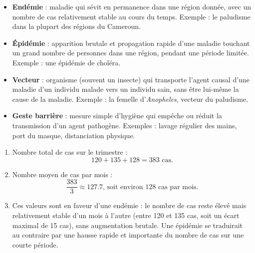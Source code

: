 \documentclass[11pt]{article}
\newcommand{\cle}[1]{{\popxbold\color{popdark}#1}}
\begin{document}
\begin{corrige}
\begin{itemize}
\item \textbf{Endémie} : maladie qui sévit en permanence dans une région donnée, avec un nombre de cas relativement stable au cours du temps. Exemple : le paludisme dans la plupart des régions du Cameroun.
\item \textbf{Épidémie} : apparition brutale et propagation rapide d'une maladie touchant un grand nombre de personnes dans une région, pendant une période limitée. Exemple : une épidémie de choléra.
\item \textbf{Vecteur} : organisme (souvent un insecte) qui transporte l'agent causal d'une maladie d'un individu malade vers un individu sain, sans être lui-même la cause de la maladie. Exemple : la femelle d'\emph{Anopheles}, vecteur du paludisme.
\item \textbf{Geste barrière} : mesure simple d'hygiène qui empêche ou réduit la transmission d'un agent pathogène. Exemples : lavage régulier des mains, port du masque, distanciation physique.
\end{itemize}
\end{corrige}

\begin{corrige}
\begin{enumerate}
\item Nombre total de cas sur le trimestre :
\[120 + 135 + 128 = 383 \text{ cas.}\]
\item Nombre moyen de cas par mois :
\[\frac{383}{3} \approx \num{127,7} \text{, soit environ } \num{128} \text{ cas par mois.}\]
\item Ces valeurs sont en faveur d'une \cle{endémie} : le nombre de cas reste élevé mais relativement stable d'un mois à l'autre (entre 120 et 135 cas, soit un écart maximal de 15 cas), sans augmentation brutale. Une épidémie se traduirait au contraire par une hausse rapide et importante du nombre de cas sur une courte période.
\end{enumerate}
\end{corrige}
\end{document}
